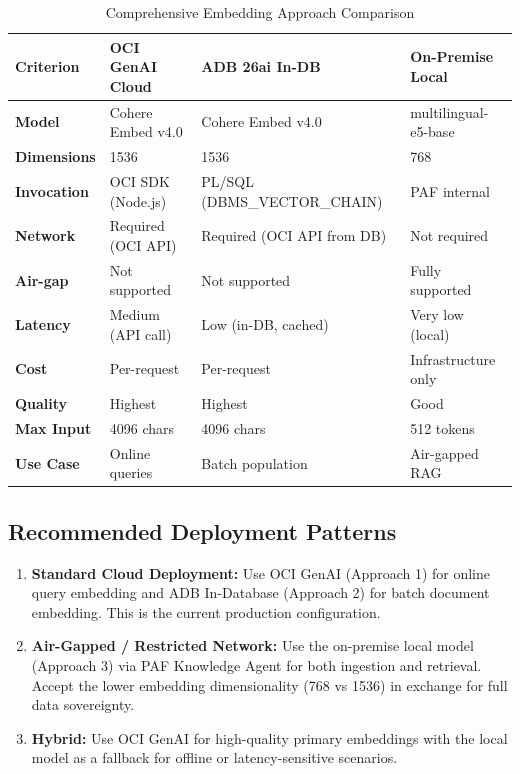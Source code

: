 \documentclass[12pt,a4paper]{article}
\begin{document}
\begin{table}[H]
\centering
\caption{Comprehensive Embedding Approach Comparison}
\label{tab:detailed-comparison}
\begin{tabularx}{\textwidth}{l X X X}
\toprule
\textbf{Criterion} & \textbf{OCI GenAI Cloud} & \textbf{ADB 26ai In-DB} & \textbf{On-Premise Local} \\
\midrule
\textbf{Model} & Cohere Embed v4.0 & Cohere Embed v4.0 & multilingual-e5-base \\
\textbf{Dimensions} & 1536 & 1536 & 768 \\
\textbf{Invocation} & OCI SDK (Node.js) & PL/SQL (DBMS\_VECTOR\_CHAIN) & PAF internal \\
\textbf{Network} & Required (OCI API) & Required (OCI API from DB) & Not required \\
\textbf{Air-gap} & Not supported & Not supported & Fully supported \\
\textbf{Latency} & Medium (API call) & Low (in-DB, cached) & Very low (local) \\
\textbf{Cost} & Per-request & Per-request & Infrastructure only \\
\textbf{Quality} & Highest & Highest & Good \\
\textbf{Max Input} & 4096 chars & 4096 chars & 512 tokens \\
\textbf{Use Case} & Online queries & Batch population & Air-gapped RAG \\
\bottomrule
\end{tabularx}
\end{table}

\subsection{Recommended Deployment Patterns}

\begin{enumerate}[label=\textbf{\arabic*.}]
  \item \textbf{Standard Cloud Deployment:} Use OCI GenAI (Approach 1) for online query embedding and ADB In-Database (Approach 2) for batch document embedding. This is the current production configuration.

  \item \textbf{Air-Gapped / Restricted Network:} Use the on-premise local model (Approach 3) via PAF Knowledge Agent for both ingestion and retrieval. Accept the lower embedding dimensionality (768 vs 1536) in exchange for full data sovereignty.

  \item \textbf{Hybrid:} Use OCI GenAI for high-quality primary embeddings with the local model as a fallback for offline or latency-sensitive scenarios.
\end{enumerate}
\end{document}
